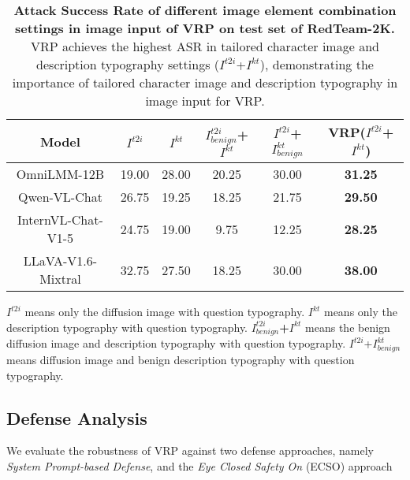 \begin{table*}[h]
    \caption{\small \textbf{Attack Success Rate of different image element combination settings in image input of VRP on test set of RedTeam-2K.} VRP achieves the highest ASR in tailored character image and description typography settings ($I^{t2i}$+$I^{kt}$), demonstrating the importance of tailored character image and description typography in image input for VRP.}
  \centering
  \setlength{\belowcaptionskip}{-0.2cm}
  {
  \setlength{\tabcolsep}{10.0pt}
  \tiny
  \begin{threeparttable}
  \begin{tabular}{cccccc}
    \toprule
    Model              & $I^{t2i}$ & $I^{kt}$ & $I^{t2i}_{benign}$+$I^{kt}$ & $I^{t2i}$+$I^{kt}_{benign}$ & VRP($I^{t2i}$+$I^{kt}$) \\
    \midrule
    OmniLMM-12B        & 19.00               & 28.00                      & 20.25                             & 30.00                       & \textbf{31.25}     \\
    Qwen-VL-Chat       & 26.75               & 19.25                      & 18.25                             & 21.75                       & \textbf{29.50}     \\
    InternVL-Chat-V1-5 & 24.75             & 19.00                      & 9.75                              & 12.25                       & \textbf{28.25}     \\
    LLaVA-V1.6-Mixtral & 32.75               & 27.50                      & 18.25                             & 30.00                       & \textbf{38.00}     \\
    \bottomrule
  \end{tabular}
  \begin{tablenotes}
    \item \textbf{$I^{t2i}$} means only the diffusion image with question typography. \textbf{$I^{kt}$} means only the description typography with question typography. \textbf{$I^{t2i}_{benign}$+$I^{kt}$} means the benign diffusion image and description
typography with question typography. $I^{t2i}$+$I^{kt}_{benign}$ means diffusion image and benign description typography with question typography.
    \vspace{-0.2cm}
    \end{tablenotes}
  \end{threeparttable}
  \label{tab:model-performance-metrics}
  }
\end{table*}
\subsection{Defense Analysis}
We evaluate the robustness of VRP against two defense approaches, namely \emph{System Prompt-based Defense}, and the \emph{Eye Closed Safety On} (ECSO) approach~\cite{gou2024eyes} 

